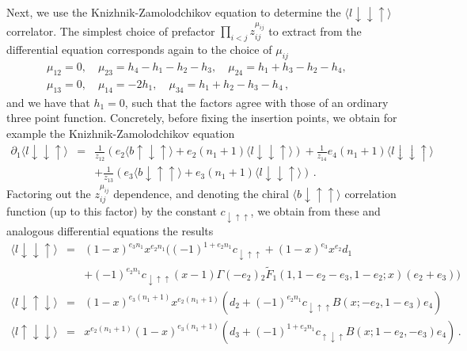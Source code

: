 \documentclass[12pt]{article}
\numberwithin{equation}{section}
\numberwithin{equation}{section}
\numberwithin{table}{section}\setlength{\multlinegap}{25pt}
\begin{document}
Next, we use the Knizhnik-Zamolodchikov equation to determine the $ \langle l \downarrow \downarrow \uparrow \rangle $ correlator.
The simplest choice of prefactor $\prod_{i<j} z_{ij}^{\mu_{ij}}$ to extract from the differential equation corresponds again to the choice
of $\mu_{ij}$
\begin{eqnarray}
\mu_{12} =0, \quad \mu_{23}=h_4-h_1-h_2-h_3, \quad \mu_{24}=h_1+h_3-h_2-h_4, & & \nonumber \\
\mu_{13}=0, \quad \mu_{14}=- 2 h_1, \quad \mu_{34}=h_1+h_2-h_3-h_4     \, ,     & &
\end{eqnarray}
and we have that $h_1=0$, such that the factors agree with those of an ordinary three point function.
Concretely, before fixing the insertion points, 
we obtain for example the Knizhnik-Zamolodchikov equation
\begin{eqnarray}
\partial_1 \langle l \downarrow \downarrow \uparrow \rangle &=& \frac{1}{z_{12}} ( e_2 \langle b \uparrow \downarrow \uparrow \rangle + e_2(n_1+1) \langle l \downarrow \downarrow \uparrow \rangle)
+ \frac{1}{z_{14}} e_4 (n_1+1) \langle l \downarrow \downarrow \uparrow \rangle
\nonumber \\
& & + \frac{1}{z_{13}} ( e_3 \langle b \downarrow \uparrow \uparrow \rangle + e_3 (n_1+1) \langle l \downarrow \downarrow \uparrow \rangle)
 \, .
\end{eqnarray}
Factoring out the $z_{ij}^{\mu_{ij}}$ dependence, and denoting the chiral $\langle b  \downarrow \uparrow \uparrow \rangle$ correlation
function (up to this factor) by the constant $c_{ \downarrow \uparrow \uparrow}$, we obtain from these and analogous differential
equations the results
\begin{eqnarray}
\langle l  \downarrow \downarrow \uparrow \rangle &=& (1-x)^{e_3 n_1} x^{e_2 n_1} ( (-1)^{1+e_2 n_1} c_{ \downarrow \uparrow \uparrow} + (1-x)^{e_3} x^{e_2} d_1
 \\
& & 
+ (-1)^{e_2 n_1} c_{ \downarrow \uparrow \uparrow} (x-1) \Gamma(-e_2) {}_2 \tilde{F}_1 (1,1-e_2-e_3,1-e_2;x) (e_2+e_3))
\nonumber \\
\langle l \downarrow \uparrow \downarrow \rangle &=& (1-x)^{e_3 (n_1+1)} x^{e_2(n_1+1)} (d_2 + (-1)^{e_2 n_1} c_{ \downarrow \uparrow \uparrow} B(x;-e_2,1-e_3) e_4)
\nonumber \\
\langle l  \uparrow \downarrow \downarrow \rangle &=& x^{e_2 (n_1+1)} (1-x)^{e_3 (n_1+1)} (d_3 + (-1)^{1+e_2 n_1} c_{ \uparrow \downarrow \uparrow} B(x;1-e_2,-e_3) e_4) \, .
\nonumber
\end{eqnarray}
\end{document}
